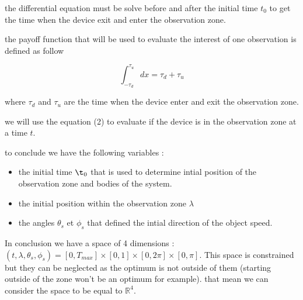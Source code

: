 \documentclass[11pt]{article} %
\begin{document}
		the differential equation must be solve before and after the initial time $t_0$ to get the time when the device exit and enter the observation zone.
		
		the payoff function that will be used to evaluate the interest of one observation is defined as follow
		
		$$
		\int_{-\tau_d}^{\tau_u}dx=\tau_d+\tau_u
		$$
		
		
		where  $\tau_d$ and $\tau_u$ are the time when the device enter and exit the observation zone.
		
		we will use the equation (2) to evaluate if the device is in the observation zone at a time $t$.
		
		
		
		to conclude we have the following variables : 
		
		\begin{itemize}
			\item the initial time $\t_0$ that is used to determine intial position of the observation zone and bodies of the system.%
			\item the initial position within the observation zone $\lambda$ %
			\item the angles $\theta_s$ et $\phi_s$ that defined the intial direction of the object speed.%
		\end{itemize}
		
		In conclusion we have a space of 4 dimensions :$(t,\lambda,\theta_s,\phi_s)=[0,T_{max}]\times[0,1]\times[0,2\pi]\times[0,\pi]$. This space is constrained but they can be neglected as the optimum is not outside of them (starting outside of the zone won't be an optimum for example). that mean we can consider the space to be equal to $\mathbb{R}^4$.
		
		
		
\end{document}
